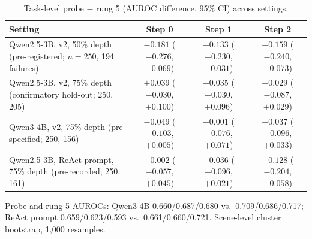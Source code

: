 \begin{table}[htbp]
\centering\small
\caption{Task-level probe $-$ rung 5 (AUROC difference, 95\% CI) across settings.}\label{tab:settings}
\begin{tabularx}{\linewidth}{@{}Lccc@{}}
\toprule
Setting & Step 0 & Step 1 & Step 2 \\
\midrule
Qwen2.5-3B, v2, 50\% depth (pre-registered; $n = 250$, 194 failures) & $-0.181$ ($-0.276$, $-0.069$) & $-0.133$ ($-0.230$, $-0.031$) & $-0.159$ ($-0.240$, $-0.073$) \\
Qwen2.5-3B, v2, 75\% depth (confirmatory hold-out; 250, 205) & $+0.039$ ($-0.030$, $+0.100$) & $+0.035$ ($-0.030$, $+0.096$) & $-0.029$ ($-0.087$, $+0.029$) \\
Qwen3-4B, v2, 75\% depth (pre-specified; 250, 156) & $-0.049$ ($-0.103$, $+0.005$) & $+0.001$ ($-0.076$, $+0.071$) & $-0.037$ ($-0.096$, $+0.033$) \\
Qwen2.5-3B, ReAct prompt, 75\% depth (pre-recorded; 250, 161) & $-0.002$ ($-0.057$, $+0.045$) & $-0.036$ ($-0.096$, $+0.021$) & $-0.128$ ($-0.204$, $-0.058$) \\
\bottomrule
\end{tabularx}
\par\smallskip\raggedright\footnotesize
Probe and rung-5 AUROCs: Qwen3-4B 0.660/0.687/0.680 vs.\ 0.709/0.686/0.717; ReAct prompt 0.659/0.623/0.593 vs.\ 0.661/0.660/0.721. Scene-level cluster bootstrap, 1,000 resamples.
\end{table}
